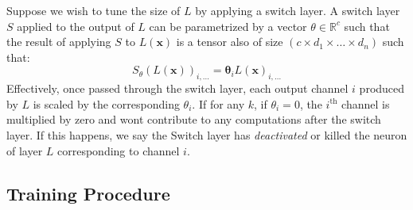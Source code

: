 Suppose we wish to tune the size of $L$ by applying a switch layer.
A switch layer $S$ applied to the output of $L$ can be parametrized by a 
vector $\theta \in \mathbb{R}^c$ such that the result of applying $S$ to $L(\bm{x})$
is a tensor also of size $\left(c \times d_1 \times \dots \times d_n\right)$
such that: 
\begin{equation} 
S_{\theta}(L(\bm{x}))_{i,...} = \bm{\theta}_iL(\bm{x})_{i, ...}
\end{equation}
Effectively, once passed through the switch layer, each output channel $i$ 
produced by $L$ is scaled by the corresponding $\theta_i$.
If for any $k$, if $\theta_i = 0$, the $i^{\text{th}}$ channel is multiplied by 
zero and wont contribute to any computations after the switch layer.
If this happens, we say the Switch layer has {\it deactivated} or killed the 
neuron of layer $L$ corresponding to channel $i$. 



\subsection{Training Procedure} 

